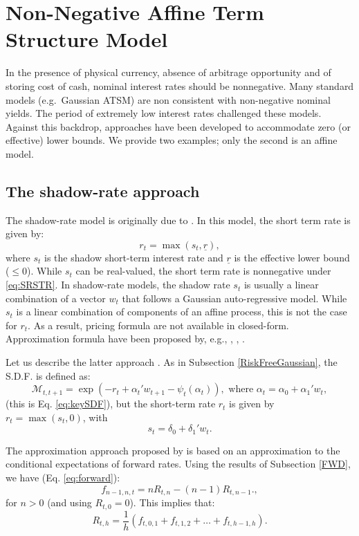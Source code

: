 \documentclass[
  12pt,
]{book}
\theoremstyle{definition}
\theoremstyle{definition}
\theoremstyle{definition}
\theoremstyle{definition}
\theoremstyle{remark}
\begin{document}
\hypertarget{RiskFreeNonNegative}{%
\section{Non-Negative Affine Term Structure Model}\label{RiskFreeNonNegative}}

In the presence of physical currency, absence of arbitrage opportunity and of storing cost of cash, nominal interest rates should be nonnegative. Many standard models (e.g.~Gaussian ATSM) are non consistent with non-negative nominal yields. The period of extremely low interest rates challenged these models. Against this backdrop, approaches have been developed to accommodate zero (or effective) lower bounds. We provide two examples; only the second is an affine model.

\hypertarget{the-shadow-rate-approach}{%
\subsection{The shadow-rate approach}\label{the-shadow-rate-approach}}

The shadow-rate model is originally due to \citet{Black_1995}. In this model, the short term rate is given by:
\begin{equation}
r_t = \max(s_t,\underline{r}),\label{eq:SRSTR}
\end{equation}
where \(s_t\) is the shadow short-term interest rate and \(\underline{r}\) is the effective lower bound (\(\le 0\)). While \(s_t\) can be real-valued, the short term rate is nonnegative under \eqref{eq:SRSTR}. In shadow-rate models, the shadow rate \(s_t\) is usually a linear combination of a vector \(w_t\) that follows a Gaussian auto-regressive model. While \(s_t\) is a linear combination of components of an affine process, this is not the case for \(r_t\). As a result, pricing formula are not available in closed-form. Approximation formula have been proposed by, e.g., \citet{Krippner_2013}, \citet{Priebsch_2013}, \citet{Wu_Xia_2016}.

Let us describe the latter approach \citep{Wu_Xia_2016}. As in Subsection \ref{RiskFreeGaussian}, the S.D.F. is defined as:
\[
\mathcal{M}_{t,t+1} = \exp(- r_t + \alpha_t'w_{t+1} - \psi_t(\alpha_t)), \mbox{ where } \alpha_t = \alpha_0 + \alpha_1'w_t,
\]
(this is Eq. \eqref{eq:keySDF}), but the short-term rate \(r_t\) is given by \(r_t = \max(s_t,0)\), with
\[
s_t = \delta_0 + \delta_1' w_t.
\]

The approximation approach proposed by \citet{Wu_Xia_2016} is based on an approximation to the conditional expectations of forward rates. Using the results of Subsection \ref{FWD}, we have (Eq. \eqref{eq:forward}):
\[
f_{n-1,n,t} = n R_{t,n} - (n-1) R_{t,n-1}.,
\]
for \(n>0\) (and using \(R_{t,0}=0\)). This implies that:
\[
R_{t,h} =  \frac{1}{h}(f_{t,0,1}+f_{t,1,2}+\dots+f_{t,h-1,h}).
\]
\end{document}
